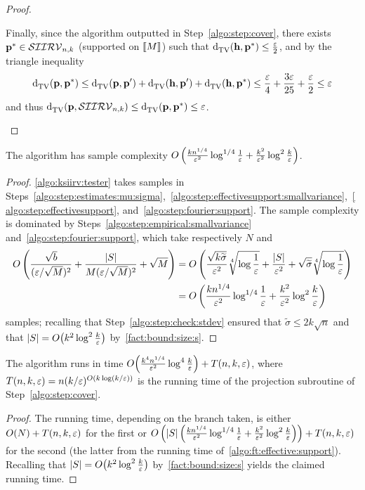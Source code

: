 \begin{proof}
\begin{itemize}
  Finally, since the algorithm outputted \accept in Step~\ref{algo:step:cover}, there exists $\p^\ast\in\classksiirv[n]{k}$ (supported on $\modulo{M}$) such that $\totalvardist{\h}{\p^\ast}\leq \frac{\eps}{2}$, and by the triangle inequality
  \[
      \totalvardist{\p}{\p^\ast} \leq \totalvardist{\p}{\p'} + \totalvardist{\h}{\p'} + \totalvardist{\h}{\p^\ast} \leq \frac{\eps}{4} + \frac{3\eps}{25} + \frac{\eps}{2} \leq \eps
  \]
  and thus $ \totalvardist{\p}{\classksiirv[n]{k}} \leq \totalvardist{\p}{\p^\ast} \leq \eps$.
 \end{itemize}
\end{proof}

\begin{lemma}\label{lemma:sample:complexity}
  The algorithm has sample complexity $O\left( \frac{k n^{1/4}}{\eps^2}\log^{1/4}\frac{1}{\eps} + \frac{k^2}{\eps^2} \log^2\frac{k}{\eps} \right)$.
\end{lemma}
\begin{proof}  \cref{algo:ksiirv:tester} takes samples in Steps~\ref{algo:step:estimates:mu:sigma},~\ref{algo:step:effectivesupport:smallvariance},~\ref{algo:step:effectivesupport}, and~\ref{algo:step:fourier:support}. The sample complexity is dominated by Steps~\ref{algo:step:empirical:smallvariance} and~\ref{algo:step:fourier:support}, which take respectively $N$ and 
  \begin{align*}
    O\left( \frac{\sqrt{b}}{(\eps/\sqrt{M})^2} + \frac{\abs{S}}{M(\eps/\sqrt{M})^2} + \sqrt{M} \right) 
    &= O\left( \frac{\sqrt{k \widetilde{\sigma}}}{\eps^2}\sqrt[4]{\log\frac{1}{\eps}} 
        + \frac{\abs{S}}{\eps^2}
        + \sqrt{\widetilde{\sigma}}\sqrt[4]{\log\frac{1}{\eps}} \right)
    \\
    &= O\left( \frac{k n^{1/4}}{\eps^2}\log^{1/4}\frac{1}{\eps} + \frac{k^2}{\eps^2}\log^2\frac{k}{\eps} \right)
  \end{align*}
  samples; recalling that Step~\ref{algo:step:check:stdev} ensured that $\widetilde{\sigma} \leq 2k\sqrt{n}$ and that $\abs{S}=\bigO{k^2\log^2\frac{k}{\eps}}$ by~\cref{fact:bound:size:s}.
\end{proof}


\begin{lemma}\label{lemma:running:time}
  The algorithm runs in time $\bigO{ \frac{k^4n^{1/4}}{\eps^2}\log^{4}\frac{k}{\eps} } + T(n,k,\eps)$, where $T(n,k,\eps)=n(k/\eps)^{\bigO{k\log(k/\eps)}}$ is the running time of the projection subroutine of Step~\ref{algo:step:cover}.
\end{lemma}
\begin{proof}  The running time, depending on the branch taken, is either $O(N)+T(n,k,\eps)$ for the first or $O\left( \abs{S}\left(\frac{k n^{1/4}}{\eps^2}\log^{1/4}\frac{1}{\eps} + \frac{k^2}{\eps^2}\log^2\frac{k}{\eps}\right) \right)+T(n,k,\eps)$ for the second (the latter from the running time of~\cref{algo:ft:effective:support}). Recalling that $\abs{S}=\bigO{k^2\log^2\frac{k}{\eps}}$ by~\cref{fact:bound:size:s} yields the claimed running time.
\end{proof}

